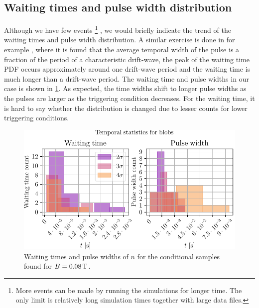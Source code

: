 \subsection{Waiting times and pulse width distribution}
%
Although we have few events%
\footnote{
    More events can be made by running the simulations for longer time.
    The only limit is relatively long simulation times together with large data files.
}%
%
, we would briefly indicate the trend of the waiting times and pulse width distribution.
A similar exercise is done in for example \cite{Hornung2011}, where it is found that the average temporal width of the pulse is a fraction of the period of a characteristic drift-wave, the peak of the waiting time PDF occurs approximately around one drift-wave period and the waiting time is much longer than a drift-wave period.
The waiting time and pulse widths in our case is shown in \cref{fig:tempStatBlob}.
As expected, the time widths shift to longer pulse widths as the pulses are larger as the triggering condition decreases.
For the waiting time, it is hard to say whether the distribution is changed due to lesser counts for lower triggering conditions.
%
\begin{figure}[h!]
    \begin{center}
        \includegraphics{fig/results/blobs/blobStatsB0_008Tweak}
    \end{center}
    \caption{
        Waiting times and pulse widths of $n$ for the conditional samples found for $B=0.08\, \text{T}$.
    }
    \label{fig:tempStatBlob}
\end{figure}
